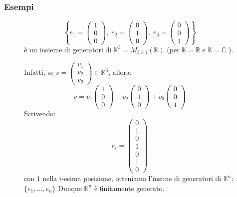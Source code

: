 \documentclass[a4paper]{article}
\theoremstyle{break}
\theoremstyle{break}
\theoremstyle{break}
\theoremstyle{break}
\begin{document}
  \subsubsection{Esempi}
  \begin{figure}[H]
    \begin{example}
      \[
      \left\{e_1=\begin{pmatrix} 
          1\\0\\0
      \end{pmatrix},\;
      e_2=\begin{pmatrix} 
        0\\1\\0
      \end{pmatrix},\;
      e_3=\begin{pmatrix} 
        0\\0\\1
      \end{pmatrix} \right\}
      \] 
      è un insieme di generatori di \( \mathbb{K}^3 = M_{3 \times 1}(\mathbb{K}) \) 
      (per \( \mathbb{K} = \mathbb{R} \) e \( \mathbb{K} = \mathbb{C} \) ).

      \noindent Infatti, se \( v = \begin{pmatrix} v_1\\v_2\\v_3 \end{pmatrix} \in \mathbb{K}^3 \), allora:
      \[
      v = v_1 \begin{pmatrix} 1\\0\\0 \end{pmatrix} + v_2 \begin{pmatrix} 0\\1\\0 \end{pmatrix} + v_3 \begin{pmatrix} 0\\0\\1 \end{pmatrix}
      \] 
      Scrivendo:
      \[
      e_i = \begin{pmatrix} 
        0\\
        \vdots\\
        0\\
        1\\
        0\\
        \vdots\\
        0
      \end{pmatrix} 
      \] 
      con \( 1 \) nella \( i \)-esima posizione, otteniamo l'insime di generatori di
      \( \mathbb{K}^n \): \( \{e_1, \ldots, e_n\}  \)  Dunque \( \mathbb{K}^n \) è finitamente generato.
    \end{example}
  \end{figure}
\end{document}
